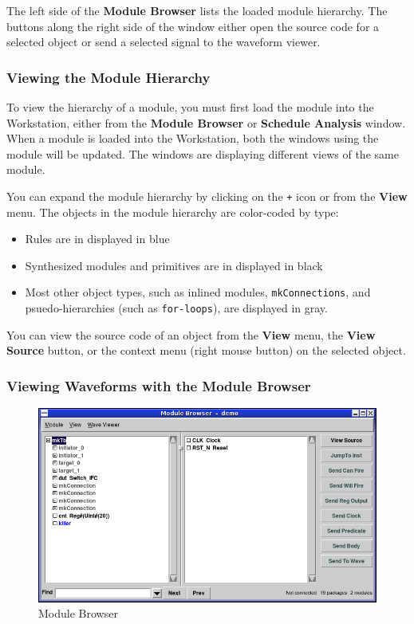 \documentclass{article}
\newcommand{\te}[1]{\texttt{#1}}
\begin{document}
The left side of the {\bf Module Browser} lists the loaded module
hierarchy.  The buttons along the right side of the window either open
the source code for a selected object  or send a selected signal to the
waveform viewer.


\subsubsection{Viewing the Module Hierarchy}

To view the   hierarchy of a module, you must first load the module into the
Workstation, either from the {\bf Module Browser} or {\bf Schedule
Analysis} window.  When a  module is loaded into the Workstation, both
the windows using the module will be updated.  The  windows are
 displaying different views of the same module.

You can expand the module hierarchy by clicking on the \te{+} icon or from
the {\bf View} menu.  The objects in the module hierarchy are
color-coded by type:
\begin{itemize}
\item Rules are in displayed in blue
\item Synthesized modules and primitives are in displayed in black
\item Most other object types, such as inlined modules,
\te{mkConnections}, and psuedo-hierarchies (such as \te{for-loops}), are displayed in gray.
\end{itemize}

You can view the source code of an object from  the {\bf View}
menu, the {\bf View Source} button,  or the context menu (right mouse
button) on the selected object.


\subsubsection{Viewing Waveforms with the Module Browser}


\begin{figure}[ht]
\begin{center}
\includegraphics[width = 4.5 in]{figures/modulebrowser}
\caption{Module Browser}
\label{fig-modulebrowser}
\end{center}
\end{figure}
\end{document}
